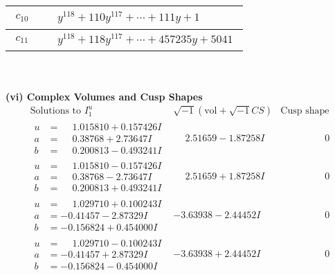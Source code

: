 \documentclass[1p]{elsarticle_modified}
\theoremstyle{definition}
\newcommand{\I}{\sqrt{-1}}
\begin{document}
\begin{tabular}{m{50pt}|m{274pt}}
\hline $$\begin{aligned}c_{10}\end{aligned}$$&$\begin{aligned}
&y^{118}+110 y^{117}+\cdots+111 y+1
\end{aligned}$\\
\hline $$\begin{aligned}c_{11}\end{aligned}$$&$\begin{aligned}
&y^{118}+118 y^{117}+\cdots+457235 y+5041
\end{aligned}$\\
\hline
\end{tabular}\\~\\
\newpage\flushleft \textbf{(vi) Complex Volumes and Cusp Shapes}
$$\begin{array}{c|c|c}  
\text{Solutions to }I^u_{1}& \I (\text{vol} + \sqrt{-1}CS) & \text{Cusp shape}\\
 \hline 
\begin{aligned}
u &= \phantom{-}1.015810 + 0.157426 I \\
a &= \phantom{-}0.38768 + 2.73647 I \\
b &= \phantom{-}0.200813 - 0.493241 I\end{aligned}
 & \phantom{-}2.51659 - 1.87258 I & \phantom{-0.000000 } 0 \\ \hline\begin{aligned}
u &= \phantom{-}1.015810 - 0.157426 I \\
a &= \phantom{-}0.38768 - 2.73647 I \\
b &= \phantom{-}0.200813 + 0.493241 I\end{aligned}
 & \phantom{-}2.51659 + 1.87258 I & \phantom{-0.000000 } 0 \\ \hline\begin{aligned}
u &= \phantom{-}1.029710 + 0.100243 I \\
a &= -0.41457 - 2.87329 I \\
b &= -0.156824 + 0.454000 I\end{aligned}
 & -3.63938 - 2.44452 I & \phantom{-0.000000 } 0 \\ \hline\begin{aligned}
u &= \phantom{-}1.029710 - 0.100243 I \\
a &= -0.41457 + 2.87329 I \\
b &= -0.156824 - 0.454000 I\end{aligned}
 & -3.63938 + 2.44452 I & \phantom{-0.000000 } 0 \\ \hline\begin{aligned}

\end{aligned}
\end{array}$$
\end{document}
